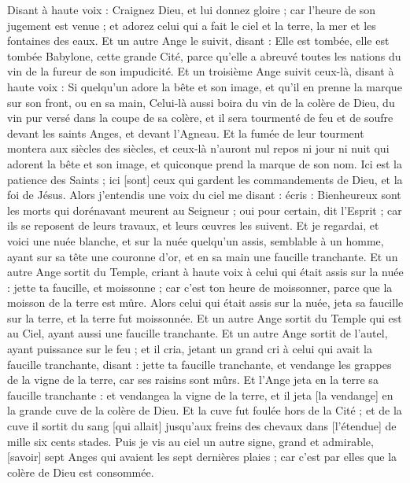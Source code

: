 \begin{multicols}{2}
Disant à haute voix : Craignez Dieu, et lui donnez gloire ; car l'heure de son jugement est venue ; et adorez celui qui a fait le ciel et la terre, la mer et les fontaines des eaux.
Et un autre Ange le suivit, disant : Elle est tombée, elle est tombée Babylone, cette grande Cité, parce qu'elle a abreuvé toutes les nations du vin de la fureur de son impudicité.
Et un troisième Ange suivit ceux-là, disant à haute voix : Si quelqu'un adore la bête et son image, et qu'il en prenne la marque sur son front, ou en sa main,
Celui-là aussi boira du vin de la colère de Dieu, du vin pur versé dans la coupe de sa colère, et il sera tourmenté de feu et de soufre devant les saints Anges, et devant l'Agneau.
Et la fumée de leur tourment montera aux siècles des siècles, et ceux-là n'auront nul repos ni jour ni nuit qui adorent la bête et son image, et quiconque prend la marque de son nom.
Ici est la patience des Saints ; ici [sont] ceux qui gardent les commandements de Dieu, et la foi de Jésus.
Alors j'entendis une voix du ciel me disant : écris : Bienheureux sont les morts qui dorénavant meurent au Seigneur ; oui pour certain, dit l'Esprit ; car ils se reposent de leurs travaux, et leurs œuvres les suivent.
Et je regardai, et voici une nuée blanche, et sur la nuée quelqu'un assis, semblable à un homme, ayant sur sa tête une couronne d'or, et en sa main une faucille tranchante.
Et un autre Ange sortit du Temple, criant à haute voix à celui qui était assis sur la nuée : jette ta faucille, et moissonne ; car c'est ton heure de moissonner, parce que la moisson de la terre est mûre.
Alors celui qui était assis sur la nuée, jeta sa faucille sur la terre, et la terre fut moissonnée.
Et un autre Ange sortit du Temple qui est au Ciel, ayant aussi une faucille tranchante.
Et un autre Ange sortit de l'autel, ayant puissance sur le feu ; et il cria, jetant un grand cri à celui qui avait la faucille tranchante, disant : jette ta faucille tranchante, et vendange les grappes de la vigne de la terre, car ses raisins sont mûrs.
Et l'Ange jeta en la terre sa faucille tranchante : et vendangea la vigne de la terre, et il jeta [la vendange] en la grande cuve de la colère de Dieu.
Et la cuve fut foulée hors de la Cité ; et de la cuve il sortit du sang [qui allait] jusqu'aux freins des chevaux dans [l'étendue] de mille six cents stades.
\VerseOne{}Puis je vis au ciel un autre signe, grand et admirable, [savoir] sept Anges qui avaient les sept dernières plaies ; car c'est par elles que la colère de Dieu est consommée.

\end{multicols}
